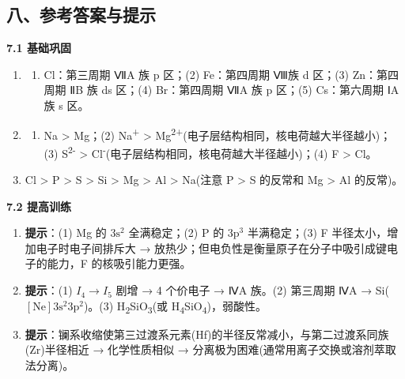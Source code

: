 \subsection{八、参考答案与提示}\label{ux516bux53c2ux8003ux7b54ux6848ux4e0eux63d0ux793a}

\textbf{7.1 基础巩固}

\begin{enumerate}
\def\labelenumi{\arabic{enumi}.}
\tightlist
\item
  \begin{enumerate}
  \def\labelenumii{(\arabic{enumii})}
  \tightlist
  \item
    Cl：第三周期 ⅦA 族 p 区；(2) Fe：第四周期 Ⅷ族 d 区；(3) Zn：第四周期 ⅡB 族 ds 区；(4) Br：第四周期 ⅦA 族 p 区；(5) Cs：第六周期 ⅠA 族 s 区。
  \end{enumerate}
\item
  \begin{enumerate}
  \def\labelenumii{(\arabic{enumii})}
  \tightlist
  \item
    Na \textgreater{} Mg；(2) Na\textsuperscript{+} \textgreater{} Mg\textsuperscript{2+}(电子层结构相同，核电荷越大半径越小)；(3) S\textsuperscript{2-} \textgreater{} Cl\textsuperscript{-}(电子层结构相同，核电荷越大半径越小)；(4) F \textgreater{} Cl。
  \end{enumerate}
\item
  Cl \textgreater{} P \textgreater{} S \textgreater{} Si \textgreater{} Mg \textgreater{} Al \textgreater{} Na(注意 P \textgreater{} S 的反常和 Mg \textgreater{} Al 的反常)。
\end{enumerate}

\textbf{7.2 提高训练}

\begin{enumerate}
\def\labelenumi{\arabic{enumi}.}
\setcounter{enumi}{3}
\item
  \textbf{提示}：(1) Mg 的 \(3\mathrm{s}^2\) 全满稳定；(2) P 的 \(3\mathrm{p}^3\) 半满稳定；(3) F 半径太小，增加电子时电子间排斥大 → 放热少；但电负性是衡量原子在分子中吸引成键电子的能力，F 的核吸引能力更强。
\item
  \textbf{提示}：(1) \(I_4\to I_5\) 剧增 → 4 个价电子 → ⅣA 族。(2) 第三周期 ⅣA → Si(\([\mathrm{Ne}] 3\mathrm{s}^2 3\mathrm{p}^2\))。(3) H\textsubscript{2}SiO\textsubscript{3}(或 H\textsubscript{4}SiO\textsubscript{4})，弱酸性。
\item
  \textbf{提示}：镧系收缩使第三过渡系元素(Hf)的半径反常减小，与第二过渡系同族(Zr)半径相近 → 化学性质相似 → 分离极为困难(通常用离子交换或溶剂萃取法分离)。
\end{enumerate}

